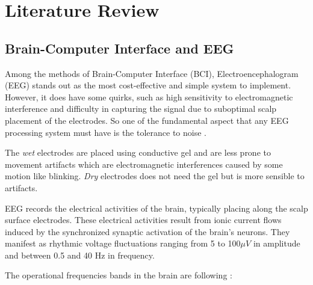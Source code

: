 \section{Literature Review}
	\label{sec:revBibli}
	
	\subsection{Brain-Computer Interface and EEG}
		\par Among the methods of Brain-Computer Interface (BCI), Electroencephalogram (EEG) stands out as the most cost-effective and simple system to implement. However, it does have some quirks, such as high sensitivity to electromagnetic interference and difficulty in capturing the signal due to suboptimal scalp placement of the electrodes. So one of the fundamental aspect that any EEG processing system must have is the tolerance to noise \cite{JALALYBIDGOLY2020101788}.
		
		\par The \textit{wet} electrodes are placed using conductive gel and are less prone to movement artifacts which are electromagnetic interferences caused by some motion like blinking. \textit{Dry} electrodes does not need the gel but is more sensible to artifacts.
		
		\par EEG records the electrical activities of the brain, typically placing along the scalp surface electrodes. These electrical activities result from ionic current flows induced by the synchronized synaptic activation of the brain's neurons. They manifest as rhythmic voltage fluctuations ranging from 5 to 100$\mu V$ in amplitude and between 0.5 and 40 Hz in frequency\cite{JALALYBIDGOLY2020101788}.

		\par The operational frequencies bands in the brain are following \cite{sanei2021eeg}:
		

